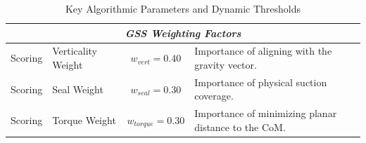 \documentclass[12pt, a4paper]{article}
\begin{document}
\begin{table}
\begin{tabularx}{\textwidth}{@{}llc >{\raggedright\arraybackslash}X@{}}
        \midrule
        \multicolumn{4}{c}{\textit{GSS Weighting Factors}} \\
        \midrule
        Scoring & Verticality Weight & $w_{vert} = 0.40$ & Importance of aligning with the gravity vector. \\
        Scoring & Seal Weight & $w_{seal} = 0.30$ & Importance of physical suction coverage. \\
        Scoring & Torque Weight & $w_{torque} = 0.30$ & Importance of minimizing planar distance to the CoM. \\
        \bottomrule
    \end{tabularx}
    \caption{Key Algorithmic Parameters and Dynamic Thresholds}
    \label{tab:grasp_parameters}
\end{table}


\end{document}
